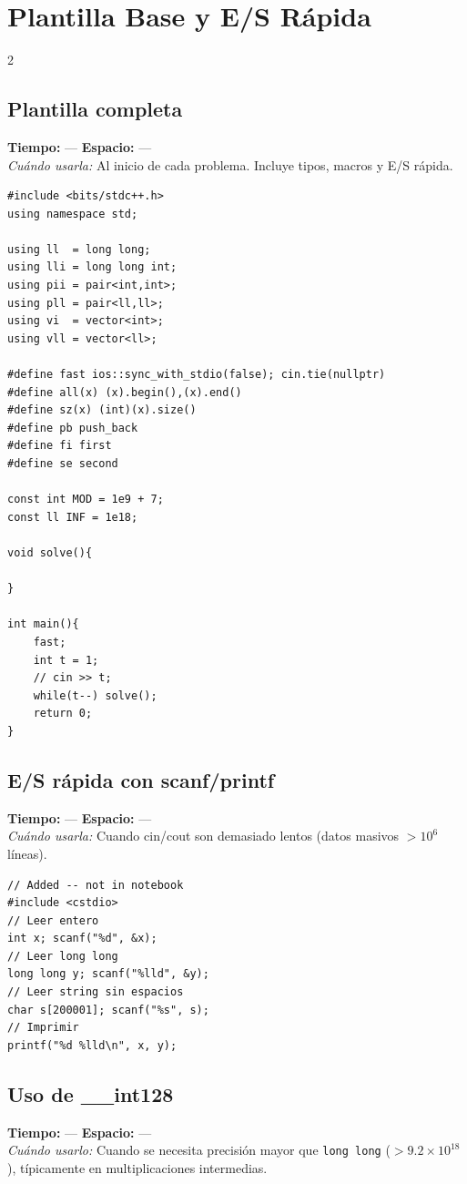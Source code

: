\documentclass[10pt,a4paper]{article}
\begin{document}
\section{Plantilla Base y E/S R\'apida}
\begin{multicols}{2}

\subsection{Plantilla completa}
\textbf{Tiempo:} --- \quad \textbf{Espacio:} ---\\
\textit{Cu\'ando usarla:} Al inicio de cada problema. Incluye tipos, macros y E/S r\'apida.

\begin{lstlisting}
#include <bits/stdc++.h>
using namespace std;

using ll  = long long;
using lli = long long int;
using pii = pair<int,int>;
using pll = pair<ll,ll>;
using vi  = vector<int>;
using vll = vector<ll>;

#define fast ios::sync_with_stdio(false); cin.tie(nullptr)
#define all(x) (x).begin(),(x).end()
#define sz(x) (int)(x).size()
#define pb push_back
#define fi first
#define se second

const int MOD = 1e9 + 7;
const ll INF = 1e18;

void solve(){

}

int main(){
    fast;
    int t = 1;
    // cin >> t;
    while(t--) solve();
    return 0;
}
\end{lstlisting}

\subsection{E/S r\'apida con scanf/printf}
\textbf{Tiempo:} --- \quad \textbf{Espacio:} ---\\
\textit{Cu\'ando usarla:} Cuando cin/cout son demasiado lentos (datos masivos $>10^6$ l\'ineas).

\begin{lstlisting}
// Added -- not in notebook
#include <cstdio>
// Leer entero
int x; scanf("%d", &x);
// Leer long long
long long y; scanf("%lld", &y);
// Leer string sin espacios
char s[200001]; scanf("%s", s);
// Imprimir
printf("%d %lld\n", x, y);
\end{lstlisting}

\subsection{Uso de \_\_int128}
\textbf{Tiempo:} --- \quad \textbf{Espacio:} ---\\
\textit{Cu\'ando usarlo:} Cuando se necesita precisi\'on mayor que \texttt{long long} ($>9.2\times10^{18}$), t\'ipicamente en multiplicaciones intermedias.


\end{multicols}
\end{document}
